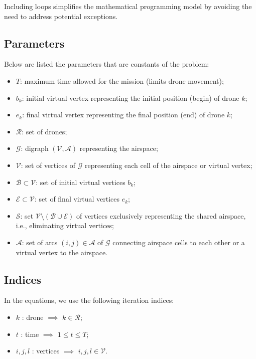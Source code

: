 Including loops simplifies the mathematical programming model by avoiding the need to address potential exceptions.

\subsection{Parameters}

Below are listed the parameters that are constants of the problem:

\begin{itemize}
\item $T$: maximum time allowed for the mission (limits drone movement);
\item $b_k$: initial virtual vertex representing the initial position (begin) of drone $k$;
\item $e_k$: final virtual vertex representing the final position (end) of drone $k$;
\item $\mathcal{R}$: set of drones;
\item $\mathcal{G}$: digraph $(\mathcal{V}, \mathcal{A})$ representing the airspace;
\item $\mathcal{V}$: set of vertices of $\mathcal{G}$ representing each cell of the airspace or virtual vertex;
\item $\mathcal{B} \subset \mathcal{V}$: set of initial virtual vertices $b_k$;
\item $\mathcal{E} \subset \mathcal{V}$: set of final virtual vertices $e_k$;
\item $\mathcal{S}$: set $\mathcal{V} \setminus (\mathcal{B} \cup \mathcal{E})$ of vertices exclusively representing the shared airspace, i.e., eliminating virtual vertices;
\item $\mathcal{A}$: set of arcs $(i,j) \in \mathcal{A}$ of $\mathcal{G}$ connecting airspace cells to each other or a virtual vertex to the airspace.
\end{itemize}

\subsection{Indices}

In the equations, we use the following iteration indices:

\begin{itemize}
\item $k$ : drone $\implies$ $k \in \mathcal{R}$;
\item $t$ : time $\implies$ $1 \leq t \leq T $;
\item $i,j,l$ : vertices $\implies$ $i, j, l \in \mathcal{V}$.
\end{itemize}

